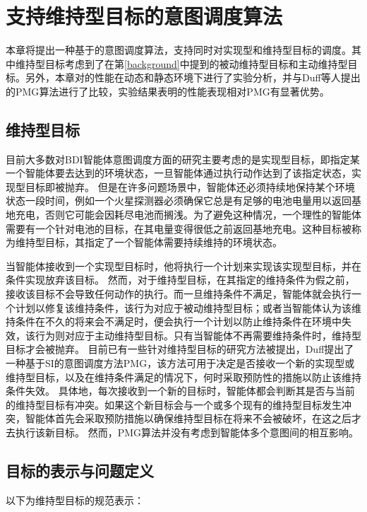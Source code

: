 \chapter{支持维持型目标的意图调度算法}\label{mg}
本章将提出一种基于\SA 的意图调度算法\SAM ，\SAM 支持同时对实现型和维持型目标的调度。其中维持型目标考虑到了在第\ref{background}中提到的被动维持型目标和主动维持型目标。另外，本章对\SAM 的性能在动态和静态环境下进行了实验分析，并与Duff等人提出的PMG\cite{DBLP:conf/atal/DuffHT06}算法进行了比较，实验结果表明\SAM 的性能表现相对PMG有显著优势。
\section{维持型目标}
目前大多数对BDI智能体意图调度方面的研究主要考虑的是实现型目标，即指定某一个智能体要去达到的环境状态，一旦智能体通过执行动作达到了该指定状态，实现型目标即被抛弃。
但是在许多问题场景中，智能体还必须持续地保持某个环境状态一段时间，例如一个火星探测器必须确保它总是有足够的电池电量用以返回基地充电，否则它可能会因耗尽电池而搁浅。为了避免这种情况，一个理性的智能体需要有一个针对电池的目标，在其电量变得很低之前返回基地充电。这种目标被称为维持型目标，其指定了一个智能体需要持续维持的环境状态。


当智能体接收到一个实现型目标时，他将执行一个计划来实现该实现型目标，并在条件实现放弃该目标。
%
然而，对于维持型目标，在其指定的维持条件为假之前，接收该目标不会导致任何动作的执行。而一旦维持条件不满足，智能体就会执行一个计划以修复该维持条件，该行为对应于被动维持型目标；或者当智能体认为该维持条件在不久的将来会不满足时，便会执行一个计划以防止维持条件在环境中失效，该行为则对应于主动维持型目标。只有当智能体不再需要维持条件时，维持型目标才会被抛弃。
目前已有一些针对维持型目标的研究方法被提出，Duff\cite{DBLP:conf/atal/DuffHT06}提出了一种基于SI的意图调度方法PMG，该方法可用于决定是否接收一个新的实现型或维持型目标，以及在维持条件满足的情况下，何时采取预防性的措施以防止该维持条件失效。
具体地，每次接收到一个新的目标时，智能体都会判断其是否与当前的维持型目标有冲突。如果这个新目标会与一个或多个现有的维持型目标发生冲突，智能体首先会采取预防措施以确保维持型目标在将来不会被破坏，在这之后才去执行该新目标。
然而，PMG算法并没有考虑到智能体多个意图间的相互影响。

\section{目标的表示与问题定义}
以下为维持型目标的规范表示：
